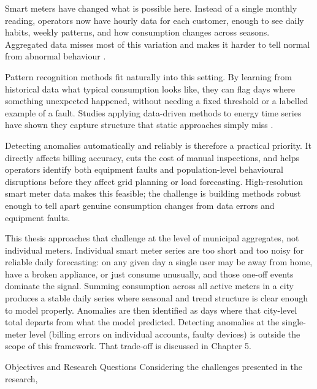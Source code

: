 ﻿\documentclass[12pt,reqno, twoside]{amsbook}
\makeatletter
\numberwithin{figure}{chapter}
\numberwithin{table}{chapter}
\numberwithin{equation}{chapter}
\def\section{\@startsection{section}{1}%
      \z@{.5\linespacing\@plus.7\linespacing}{.25\linespacing}%
      {\normalfont\bfseries\flushleft}}
\theoremstyle{plain}
\numberwithin{equation}{chapter}
\numberwithin{section}{chapter}
\makeatother
\begin{document}
Smart meters have changed what is possible here. Instead of a single monthly reading, operators now have hourly data for each customer, enough to see daily habits, weekly patterns, and how consumption changes across seasons. Aggregated data misses most of this variation and makes it harder to tell normal from abnormal behaviour \cite{himeur_artificial_2021}.

Pattern recognition methods fit naturally into this setting. By learning from historical data what typical consumption looks like, they can flag days where something unexpected happened, without needing a fixed threshold or a labelled example of a fault. Studies applying data-driven methods to energy time series have shown they capture structure that static approaches simply miss \cite{zangrando_anomaly_2022, benfer_semantic_2024}.

Detecting anomalies automatically and reliably is therefore a practical priority. It directly affects billing accuracy, cuts the cost of manual inspections, and helps operators identify both equipment faults and population-level behavioural disruptions before they affect grid planning or load forecasting. High-resolution smart meter data makes this feasible; the challenge is building methods robust enough to tell apart genuine consumption changes from data errors and equipment faults.

This thesis approaches that challenge at the level of municipal aggregates, not individual meters. Individual smart meter series are too short and too noisy for reliable daily forecasting: on any given day a single user may be away from home, have a broken appliance, or just consume unusually, and those one-off events dominate the signal. Summing consumption across all active meters in a city produces a stable daily series where seasonal and trend structure is clear enough to model properly. Anomalies are then identified as days where that city-level total departs from what the model predicted. Detecting anomalies at the single-meter level (billing errors on individual accounts, faulty devices) is outside the scope of this framework. That trade-off is discussed in Chapter 5.

\par



\vspace{\baselineskip}


\section{Objectives and Research Questions}
\label{section:objectives}
\noindent  Considering the challenges presented in the research,
\end{document}
